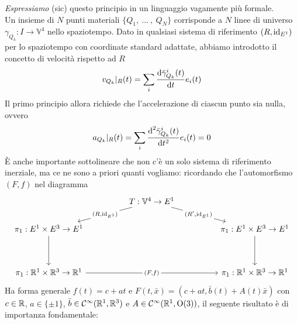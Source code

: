 \documentclass[openany]{book}
\renewcommand\C{\mc{C}}
\renewcommand\V{\mathbb{V}}
\begin{document}
\textit{Espressiamo} (sic) questo principio in un linguaggio vagamente più formale.\\
Un insieme di $N$ punti materiali $\{ Q_1,\ ...\ ,\ Q_N \}$ corrisponde a $N$ linee di universo $\gamma_{Q_k}:I\to\V^4$ nello spaziotempo. Dato in qualsiasi sistema di riferimento $(R,\operatorname{id}_{E^1})$ per lo spaziotempo con coordinate standard adattate, abbiamo introdotto il concetto di velocità rispetto ad $R$
\[ v_{Q_k}|_R (t) = \sum_i\frac{\text{d} \bar\gamma_{Q_k}^i(t)}{\text{d} t}e_i(t) \]
Il primo principio allora richiede che l'accelerazione di ciascun punto sia nulla, ovvero
\[ a_{Q_k}|_R (t) = \sum_i\frac{\text{d}^2 \bar\gamma_{Q_k}^i(t)}{\text{d} t^2}e_i(t) = 0 \]
È anche importante sottolineare che non c'è un solo sistema di riferimento inerziale, ma ce ne sono a priori quanti vogliamo: ricordando che l'automorfismo $(F,f)$ nel diagramma 
\[\begin{tikzcd}
	&& {T:\V^4 \to E^1} && \\
	{\pi_1:E^1\times E^3 \to E^1} &&&& {\pi_1:E^1\times E^3 \to E^1} \\
	\\
	{\pi_1:\R^1\times\R^3\to\R^1} &&&& {\pi_1:\R^1\times\R^3 \to \R^1}
	\arrow["{(R,\id_{E^1})}"{description}, from=1-3, to=2-1]
	\arrow["{(R',\id_{E^1})}"{description}, from=1-3, to=2-5]
	\arrow[from=2-1, to=4-1]
	\arrow[from=2-5, to=4-5]
	\arrow["{(F,f)}"{description}, from=4-1, to=4-5]
\end{tikzcd}\]
Ha forma generale $f(t) = c+at$ e $F(t,\bar x) = (c+at, \bar b(t) + A(t) \bar x)$ con $c \in \mathbb{R}$, $a \in \{\pm1\}$, $\bar b \in \C^{\infty}(\R^1, \R^3)$ e $A \in \C^{\infty}(\R^1, \O(3))$, il seguente risultato è di importanza fondamentale:
\end{document}
